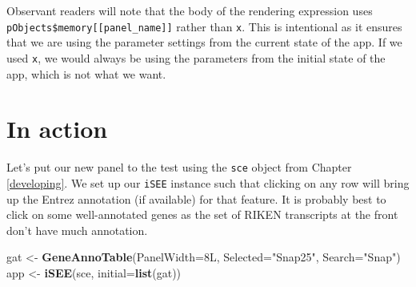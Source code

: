 \documentclass[
]{book}
\newenvironment{Shaded}{\begin{snugshade}}{\end{snugshade}}
\newcommand{\DataTypeTok}[1]{\textcolor[rgb]{0.13,0.29,0.53}{#1}}
\newcommand{\KeywordTok}[1]{\textcolor[rgb]{0.13,0.29,0.53}{\textbf{#1}}}
\newcommand{\NormalTok}[1]{#1}
\newcommand{\OperatorTok}[1]{\textcolor[rgb]{0.81,0.36,0.00}{\textbf{#1}}}
\newcommand{\StringTok}[1]{\textcolor[rgb]{0.31,0.60,0.02}{#1}}
\begin{document}
\begin{Shaded}
\end{Shaded}

Observant readers will note that the body of the rendering expression uses \texttt{pObjects\$memory{[}{[}panel\_name{]}{]}} rather than \texttt{x}.
This is intentional as it ensures that we are using the parameter settings from the current state of the app.
If we used \texttt{x}, we would always be using the parameters from the initial state of the app, which is not what we want.

\hypertarget{in-action}{%
\section{In action}\label{in-action}}

Let's put our new panel to the test using the \texttt{sce} object from Chapter \ref{developing}.
We set up our \texttt{iSEE} instance such that clicking on any row will bring up the Entrez annotation (if available) for that feature.
It is probably best to click on some well-annotated genes as the set of RIKEN transcripts at the front don't have much annotation.

\begin{Shaded}
\begin{Highlighting}[]
\NormalTok{gat <-}\StringTok{ }\KeywordTok{GeneAnnoTable}\NormalTok{(}\DataTypeTok{PanelWidth=}\NormalTok{8L, }\DataTypeTok{Selected=}\StringTok{"Snap25"}\NormalTok{, }\DataTypeTok{Search=}\StringTok{"Snap"}\NormalTok{)}
\NormalTok{app <-}\StringTok{ }\KeywordTok{iSEE}\NormalTok{(sce, }\DataTypeTok{initial=}\KeywordTok{list}\NormalTok{(gat))}
\end{Highlighting}
\end{Shaded}
\end{document}
